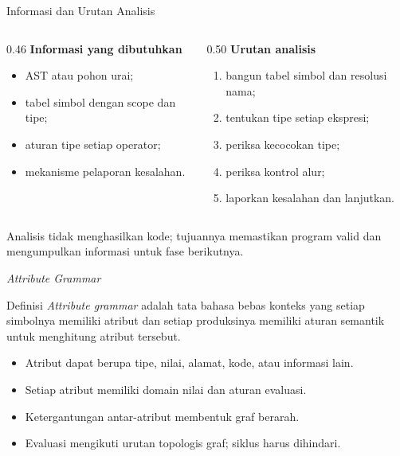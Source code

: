 \documentclass[aspectratio=169,10pt,t]{beamer}
\begin{document}
\begin{frame}{Informasi dan Urutan Analisis}
  \begin{columns}[T,onlytextwidth]
    \begin{column}{0.46\textwidth}
      \textbf{Informasi yang dibutuhkan}
      \begin{itemize}
        \item AST atau pohon urai;
        \item tabel simbol dengan scope dan tipe;
        \item aturan tipe setiap operator;
        \item mekanisme pelaporan kesalahan.
      \end{itemize}
    \end{column}
    \begin{column}{0.50\textwidth}
      \textbf{Urutan analisis}
      \begin{enumerate}
        \item bangun tabel simbol dan resolusi nama;
        \item tentukan tipe setiap ekspresi;
        \item periksa kecocokan tipe;
        \item periksa kontrol alur;
        \item laporkan kesalahan dan lanjutkan.
      \end{enumerate}
    \end{column}
  \end{columns}

  \vspace{4pt}
  {\footnotesize\color{ubbblue!80}Analisis tidak menghasilkan kode;
  tujuannya memastikan program valid dan mengumpulkan informasi untuk
  fase berikutnya.}
\end{frame}

\begin{frame}{\textit{Attribute Grammar}}
  \begin{block}{Definisi}
    \small
    \textit{Attribute grammar} adalah tata bahasa bebas konteks yang
    setiap simbolnya memiliki atribut dan setiap produksinya memiliki
    aturan semantik untuk menghitung atribut tersebut.
  \end{block}

  \begin{itemize}
    \item Atribut dapat berupa tipe, nilai, alamat, kode, atau
          informasi lain.
    \item Setiap atribut memiliki domain nilai dan aturan evaluasi.
    \item Ketergantungan antar-atribut membentuk graf berarah.
    \item Evaluasi mengikuti urutan topologis graf; siklus harus
          dihindari.
  \end{itemize}
\end{frame}
\end{document}
